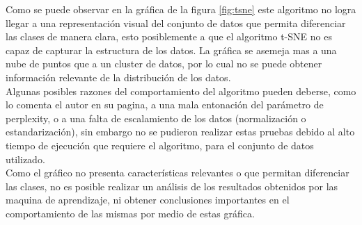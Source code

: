 \documentclass{article}
\theoremstyle{mytheoremstyle}
\theoremstyle{mytheoremstyle}
\theoremstyle{myproblemstyle}
\begin{document}
\newpage

Como se puede observar en la gráfica de la figura \ref{fig:tsne} este algoritmo no logra llegar a una representación visual del conjunto de datos que permita diferenciar las clases de manera clara, esto posiblemente a que el algoritmo t-SNE no es capaz de capturar la estructura de los datos. La gráfica se asemeja mas a una nube de puntos que a un cluster de datos, por lo cual no se puede obtener información relevante de la distribución de los datos.\\

Algunas posibles razones del comportamiento del algoritmo pueden deberse, como lo comenta el autor en su pagina, a una mala entonación del parámetro de perplexity, o a una falta de escalamiento de los datos (normalización o estandarización), sin embargo no se pudieron realizar estas pruebas debido al alto tiempo de ejecución que requiere el algoritmo, para el conjunto de datos utilizado.\\

Como el gráfico no presenta características relevantes o que permitan diferenciar las clases, no es posible realizar un análisis de los resultados obtenidos por las maquina de aprendizaje, ni obtener conclusiones importantes en el comportamiento de las mismas por medio de estas gráfica.
\end{document}
